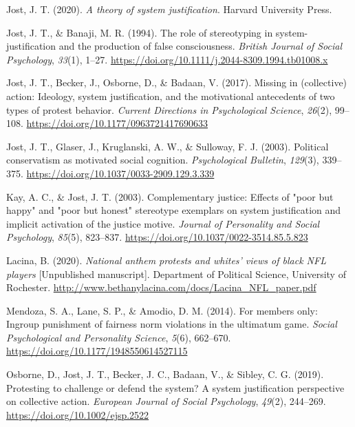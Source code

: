 \documentclass[twocolumn, 11pt, letterpaper]{article}
\newenvironment{CSLReferences}[2]{}{}
\begin{document}
\begin{CSLReferences}{1}{0}
\leavevmode{}%
Jost, J. T. (2020). \emph{A theory of system justification}. Harvard
University Press.

\leavevmode{}%
Jost, J. T., \& Banaji, M. R. (1994). The role of stereotyping in
system-justification and the production of false consciousness.
\emph{British Journal of Social Psychology}, \emph{33}(1), 1--27.
\url{https://doi.org/10.1111/j.2044-8309.1994.tb01008.x}

\leavevmode{}%
Jost, J. T., Becker, J., Osborne, D., \& Badaan, V. (2017). Missing in
(collective) action: Ideology, system justification, and the
motivational antecedents of two types of protest behavior. \emph{Current
Directions in Psychological Science}, \emph{26}(2), 99--108.
\url{https://doi.org/10.1177/0963721417690633}

\leavevmode{}%
Jost, J. T., Glaser, J., Kruglanski, A. W., \& Sulloway, F. J. (2003).
Political conservatism as motivated social cognition.
\emph{Psychological Bulletin}, \emph{129}(3), 339--375.
\url{https://doi.org/10.1037/0033-2909.129.3.339}

\leavevmode{}%
Kay, A. C., \& Jost, J. T. (2003). Complementary justice: Effects of
"poor but happy" and "poor but honest" stereotype exemplars on system
justification and implicit activation of the justice motive.
\emph{Journal of Personality and Social Psychology}, \emph{85}(5),
823--837. \url{https://doi.org/10.1037/0022-3514.85.5.823}

\leavevmode{}%
Lacina, B. (2020). \emph{National anthem protests and whites' views of
black NFL players} {[}Unpublished manuscript{]}. Department of Political
Science, University of Rochester.
\url{http://www.bethanylacina.com/docs/Lacina_NFL_paper.pdf}

\leavevmode{}%
Mendoza, S. A., Lane, S. P., \& Amodio, D. M. (2014). For members only:
Ingroup punishment of fairness norm violations in the ultimatum game.
\emph{Social Psychological and Personality Science}, \emph{5}(6),
662--670. \url{https://doi.org/10.1177/1948550614527115}

\leavevmode{}%
Osborne, D., Jost, J. T., Becker, J. C., Badaan, V., \& Sibley, C. G.
(2019). Protesting to challenge or defend the system? {A} system
justification perspective on collective action. \emph{European Journal
of Social Psychology}, \emph{49}(2), 244--269.
\url{https://doi.org/10.1002/ejsp.2522}


\end{CSLReferences}
\end{document}

